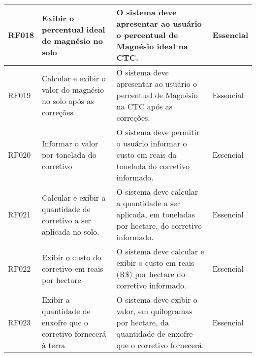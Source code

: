 \begin{table}[!htb]
\begin{tabular}{|m{1cm}|m{4cm}|m{6cm}|m{3cm}|}
        RF018 & Exibir o percentual ideal de magnésio no solo                                    & O sistema deve apresentar ao usuário o percentual de Magnésio ideal na CTC.                                                                                                                                                                                                                    & Essencial  \\\hline
        RF019 & Calcular e exibir o valor do magnésio no solo após as correções                  & O sistema deve apresentar ao usuário o percentual de Magnésio na CTC após as correções.                                                                                                                                                                                                        & Essencial  \\\hline
        RF020 & Informar o valor por tonelada do corretivo                                       & O sistema deve permitir o usuário informar o custo em reais da tonelada do corretivo informado.                                                                                                                                                                                                & Essencial  \\\hline
        RF021 & Calcular e exibir a quantidade de corretivo a ser aplicada no solo.              & O sistema deve calcular a quantidade a ser aplicada, em toneladas por hectare, do corretivo informado.                                                                                                                                                                                         & Essencial  \\\hline
        RF022 & Exibir o custo do corretivo em reais por hectare                                 & O sistema deve calcular e exibir o custo em reais (R\$) por hectare do corretivo informado.                                                                                                                                                                                                    & Essencial  \\\hline
        RF023 & Exibir a quantidade de enxofre que o corretivo fornecerá à terra                 & O sistema deve exibir o valor, em quilogramas por hectare, da quantidade de enxofre que o corretivo fornecerá.                                                                                                                                                                                 & Essencial  \\\hline

\end{tabular}
\end{table}

